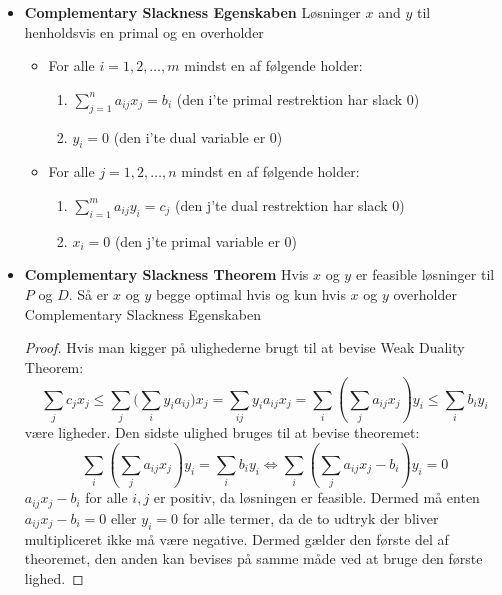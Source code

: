 \begin{itemize}
	\item \textbf{Complementary Slackness Egenskaben} Løsninger $x$ and $y$ til henholdsvis en primal og en overholder
  \begin{itemize}
  	\item For alle $i=1,2,\dots,m$ mindst en af følgende holder:
    \begin{enumerate}
    	\item $\sum_{j=1}^na_{ij}x_j=b_i$ \quad (den i'te primal restrektion har slack $0$)
      \item $y_i=0$ \hspace{50pt} (den i'te dual variable er $0$)
    \end{enumerate}
  	\item For alle $j=1,2,\dots,n$ mindst en af følgende holder:
    \begin{enumerate}
    	\item $\sum_{i=1}^ma_{ij}y_i=c_j$ \quad (den j'te dual restrektion har slack $0$)
      \item $x_i=0$ \hspace{50pt} (den j'te primal variable er $0$)
    \end{enumerate}
  \end{itemize}
  \item \textbf{Complementary Slackness Theorem} Hvis $x$ og $y$ er feasible løsninger til $P$ og $D$. Så er $x$ og $y$ begge optimal hvis og kun hvis $x$ og $y$ overholder Complementary Slackness Egenskaben
  \begin{proof} 
    Hvis man kigger på ulighederne brugt til at bevise Weak Duality Theorem:
    \begin{equation*}
      \sum_j c_jx_j \leq \sum_j \bigg(\sum_i y_i a_{ij}\bigg) x_j = \sum_{ij} y_ia_{ij} x_j = \sum_i (\sum_j a_{ij} x_j) y_i \leq \sum_i b_i y_i
    \end{equation*}
     være ligheder. Den sidste ulighed bruges til at bevise theoremet:
    \begin{equation*}
      \sum_i (\sum_j a_{ij} x_j) y_i = \sum_i b_i y_i \Leftrightarrow \sum_i (\sum_j a_{ij} x_j - b_i) y_i = 0
    \end{equation*}
    $a_{ij} x_j - b_i$ for alle $i,j$ er positiv, da løsningen er feasible. Dermed må enten $a_{ij} x_j - b_i=0$ eller $y_i=0$ for alle termer, da de to udtryk der bliver multipliceret ikke må være negative. Dermed gælder den første del af theoremet, den anden kan bevises på samme måde ved at bruge den første lighed.     
  

\end{proof}
\end{itemize}
